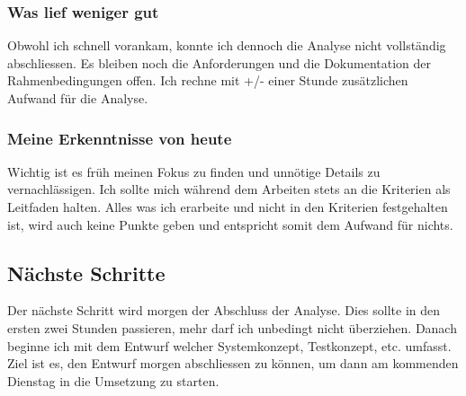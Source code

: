\subsubsection*{Was lief weniger gut}
Obwohl ich schnell vorankam, konnte ich dennoch die Analyse nicht vollständig abschliessen. Es bleiben noch die Anforderungen und die 
Dokumentation der Rahmenbedingungen offen. Ich rechne mit +/- einer Stunde zusätzlichen Aufwand für die Analyse.

\subsubsection*{Meine Erkenntnisse von heute}
Wichtig ist es früh meinen Fokus zu finden und unnötige Details zu vernachlässigen. Ich sollte mich während dem Arbeiten stets an die Kriterien
als Leitfaden halten. Alles was ich erarbeite und nicht in den Kriterien festgehalten ist, wird auch keine Punkte geben und entspricht somit
dem Aufwand für nichts.

\subsection*{Nächste Schritte}
Der nächste Schritt wird morgen der Abschluss der Analyse. Dies sollte in den ersten zwei Stunden passieren, mehr darf ich unbedingt nicht
überziehen. Danach beginne ich mit dem Entwurf welcher Systemkonzept, Testkonzept, etc. umfasst. Ziel ist es, den Entwurf morgen abschliessen zu können,
um dann am kommenden Dienstag in die Umsetzung zu starten.

\pagebreak
